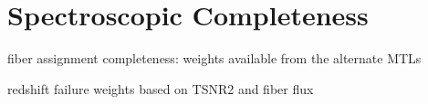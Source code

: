 \section{Spectroscopic Completeness} \label{sec:spec_comp}
fiber assignment completeness: weights available from the alternate MTLs


redshift failure weights based on TSNR2 and fiber flux 


